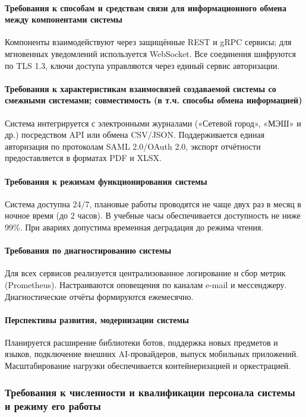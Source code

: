 \documentclass[14pt,a4paper]{extarticle}
\begin{document}
\paragraph{Требования к способам и средствам связи для информационного обмена между компонентами системы} Компоненты взаимодействуют через защищённые REST и gRPC сервисы; для мгновенных уведомлений используется WebSocket. Все соединения шифруются по TLS 1.3, ключи доступа управляются через единый сервис авторизации.

\paragraph{Требования к характеристикам взаимосвязей создаваемой системы со смежными системами; совместимость (в т.ч. способы обмена информацией)} Система интегрируется с электронными журналами («Сетевой город», «МЭШ» и др.) посредством API или обмена CSV/JSON. Поддерживается единая авторизация по протоколам SAML 2.0/OAuth 2.0, экспорт отчётности предоставляется в форматах PDF и XLSX.

\paragraph{Требования к режимам функционирования системы} Система доступна 24/7, плановые работы проводятся не чаще двух раз в месяц в ночное время (до 2 часов). В учебные часы обеспечивается доступность не ниже 99\%. При авариях допустима временная деградация до режима чтения.

\paragraph{Требования по диагностированию системы} Для всех сервисов реализуется централизованное логирование и сбор метрик (Prometheus). Настраиваются оповещения по каналам e-mail и мессенджеру. Диагностические отчёты формируются ежемесячно.

\paragraph{Перспективы развития, модернизации системы} Планируется расширение библиотеки ботов, поддержка новых предметов и языков, подключение внешних AI-провайдеров, выпуск мобильных приложений. Масштабирование нагрузки обеспечивается контейнеризацией и оркестрацией.

\subsubsection{Требования к численности и квалификации персонала системы и режиму его работы}
\end{document}
